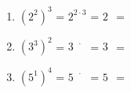 \begin{enumerate}[label=\arabic*.]
    \begin{enumerate}[label=\alph*)]
        \item $(2^2)^3$ = $2^{2 \cdot 3}$ = $2^{\phantom{0}}$ = \underline{\hspace{3cm}}
        \vspace{0.5cm}

        \item $(3^3)^2$ = $3^{\phantom{0} \cdot \phantom{0}}$ = $3^{\phantom{0}}$ = \underline{\hspace{3cm}}
        \vspace{0.5cm}

        \item $(5^1)^4$ = $5^{\phantom{0} \cdot \phantom{0}}$ = $5^{\phantom{0}}$ = \underline{\hspace{3cm}}
    \end{enumerate}

\end{enumerate}